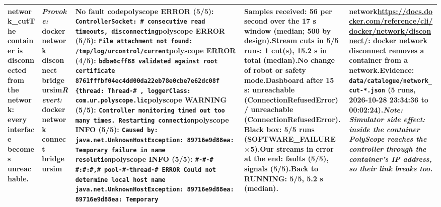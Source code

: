 \documentclass[10pt]{article}
\begin{document}
\begin{longtable}{@{}>{\raggedright\arraybackslash}p{2.7cm}>{\raggedright\arraybackslash}p{4.0cm}>{\raggedright\arraybackslash}p{7.6cm}>{\raggedright\arraybackslash}p{5.2cm}>{\raggedright\arraybackslash}p{6.0cm}@{}}
\textbf{network\_\allowbreak{}cut}\newline The container is disconnected from the network: every interface becomes unreachable. & \textit{Provoke:} docker network disconnect bridge ursim\newline\textit{Revert:} docker network connect bridge ursim & \textbf{No fault code}\newline \textsf{polyscope} ERROR (5/5): \texttt{ControllerSocket: \# consecutive read timeouts,\allowbreak{} disconnecting}\newline \textsf{polyscope} ERROR (5/5): \texttt{File attachment not found: /tmp/log/urcontrol/current}\newline \textsf{polyscope} ERROR (4/5): \texttt{bdba6cff88 validated against root certificate 8761fffbf04ec4dd00da22eb78e0cbe7e62dc08f \{thread: Thread-\# ,\allowbreak{} loggerClass: com.ur.polyscope.lic}\newline \textsf{polyscope} WARNING (5/5): \texttt{Controller monitoring timed out too many times. Restarting connection}\newline \textsf{polyscope} INFO (5/5): \texttt{Caused by: java.net.UnknownHostException: 89716e9d88ea: Temporary failure in name resolution}\newline \textsf{polyscope} INFO (5/5): \texttt{\#-\#-\# \#:\#:\#,\allowbreak{}\# pool-\#-thread-\# ERROR Could not determine local host name java.net.UnknownHostException: 89716e9d88ea: 89716e9d88ea: Temporary} & Samples received: 56 per second over the 17 s window (median; 500 by design).\newline Stream cuts in 5/5 runs: 1 cut(s), 15.2 s in total (median).\newline No change of robot or safety mode.\newline Dashboard after 15 s: unreachable (ConnectionRefusedError) / unreachable (ConnectionRefusedError).\newline Black box: 5/5 runs (SOFTWARE\_\allowbreak{}FAILURE ×5).\newline Our streams in error at the end: faults (5/5), signals (5/5).\newline Back to RUNNING: 5/5, 5.2 s (median). & \textbf{network}\newline \url{https://docs.docker.com/reference/cli/docker/network/disconnect/}: docker network disconnect removes a container from a network.\newline Evidence: \texttt{data/catalogue/network\_\allowbreak{}cut-*.json} (5 runs, 2026-10-28 23:34:36 to 00:02:24).\newline \textit{Note: Simulator side effect: inside the container PolyScope reaches the controller through the container's IP address,\allowbreak{} so their link breaks too.} \\ \midrule

\end{longtable}
\end{document}
